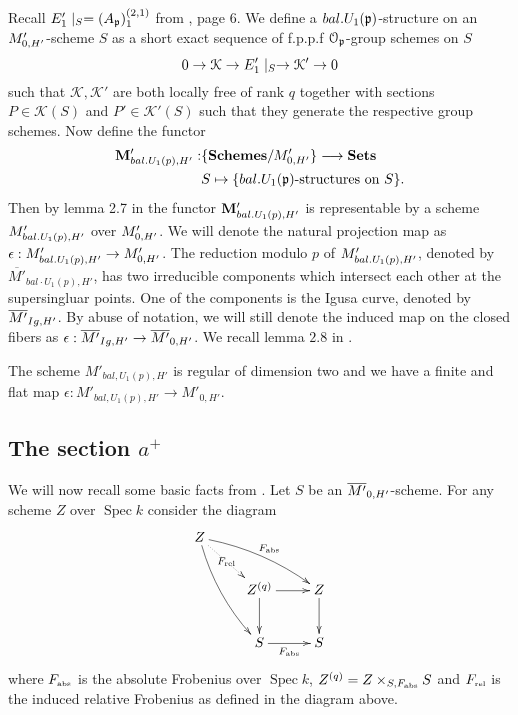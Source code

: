 \documentclass{amsart}
\numberwithin{equation}{section}
\def \mb{\mbox}
\DeclareMathOperator{\Spec}{\mathrm{Spec}}
\newcommand{\mcal}[1]{\mathcal{#1}}
\begin{document}
Recall ${E'_1}\mid_S= (A_{\mathfrak{p}})^{(2,1)}_1$ from \cite{MR2357747}, page 6.
We define a $bal.U_1(\mathfrak{p})$-structure on an $M'_{0,H'}$-scheme $S$ as a short 
exact sequence of f.p.p.f $\mathcal{O}_{\mathfrak{p}}$-group schemes on $S$ 
$$0 \map \mcal{K} \map \Eg \map \mcal{K}' \map 0$$
such that $\mcal{K}, \mcal{K}'$ are both locally free of rank $q$ together with
sections $P \in \mcal{K}(S)$ and $P' \in \mcal{K}'(S)$ such that they generate
the respective group schemes. Now define the functor
\begin{align}
\Muf: & \{{\bf Schemes}/\Mh\} \longrightarrow {\bf Sets} \\
& S \mapsto \{bal.U_1(\gp)\mb{-structures on } S \}. \nonumber
\end{align}
Then by lemma 2.7 in \cite{MR2357747} the functor ${\bf M}'_{bal.U_1(p),H'}$ is representable by a 
scheme $M'_{bal.U_1(p),H'}$ over $M'_{0,H'}$.
We will denote the natural projection map as $\epsilon:M'_{bal.U_1(p),H'} 
\rightarrow M'_{0,H'}$.
The reduction modulo $p$ of $M'_{bal.U_1(p),H'}$, denoted by 
$\overline{M'}_{bal \cdot U_1(p),H'}$, has two irreducible components which 
intersect
each other at the supersingluar points. One of the components is the Igusa
curve, denoted by $\overline{M'}_{Ig,H'}$. By abuse of notation, we will still denote
the induced map on the closed fibers as $\epsilon: \overline{M'}_{Ig,H'} \rightarrow
\overline{M'}_{0,H'}$. We recall lemma $2.8$ in \cite{MR2357747}.

\begin{lemma}
The scheme $M'_{bal, U_1(p), H'}$ is regular of dimension two and we have a 
finite and flat map $\epsilon:M'_{bal, U_1(p), H'} \rightarrow M'_{0,H'}$.
\end{lemma}

\subsection{The section $a^{+}$} 

We will now recall some basic facts from \cite{MR2357747}. 
Let $S$ be an $\overline{M'}_{0,H'}$-scheme. For any scheme $Z$ over $\Spec k$ consider 
the diagram
$$\xymatrix{
Z \ar@{.>}[rd]|--{\Frel} \ar@/^/[rrd]^\Fab \ar@/_/[rdd] & &\\
& Z^{(q)} \ar[d] \ar[r] & Z \ar[d] \\
& S \ar[r]_{\Fab} & S 
}$$
where $\Fab$ is the absolute Frobenius over $\Spec k$, $Z^{(q)} = 
Z \times_{S, \Fab} S$  and $\Frel$ is the induced 
relative Frobenius as defined in the diagram above.
\end{document}
